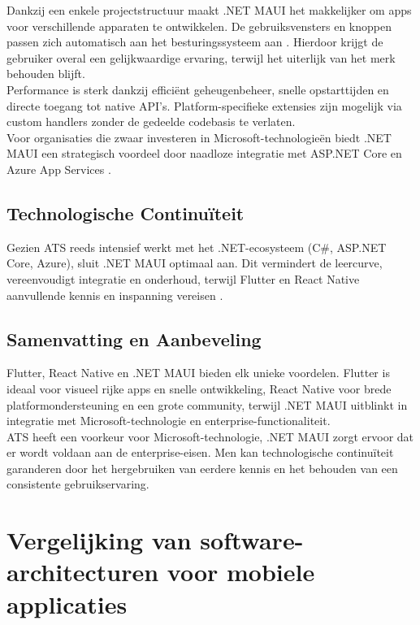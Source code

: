 Dankzij een enkele projectstructuur maakt .NET MAUI het makkelijker om apps voor verschillende apparaten te ontwikkelen. De gebruiksvensters en knoppen passen zich automatisch aan het besturingssysteem aan \autocite{Omsha2024}. Hierdoor krijgt de gebruiker overal een gelijkwaardige ervaring, terwijl het uiterlijk van het merk behouden blijft.\\

Performance is sterk dankzij efficiënt geheugenbeheer, snelle opstarttijden en directe toegang tot native API’s. Platform-specifieke extensies zijn mogelijk via custom handlers zonder de gedeelde codebasis te verlaten.\\

Voor organisaties die zwaar investeren in Microsoft-technologieën biedt .NET MAUI een strategisch voordeel door naadloze integratie met ASP.NET Core en Azure App Services \autocite{Klesman2023}.

\subsection{Technologische Continuïteit}
Gezien ATS reeds intensief werkt met het .NET-ecosysteem (C#, ASP.NET Core, Azure), sluit .NET MAUI optimaal aan. Dit vermindert de leercurve, vereenvoudigt integratie en onderhoud, terwijl Flutter en React Native aanvullende kennis en inspanning vereisen \autocite{Longe2025}.

\subsection{Samenvatting en Aanbeveling}
Flutter, React Native en .NET MAUI bieden elk unieke voordelen. Flutter is ideaal voor visueel rijke apps en snelle ontwikkeling, React Native voor brede platformondersteuning en een grote community, terwijl .NET MAUI uitblinkt in integratie met Microsoft-technologie en enterprise-functionaliteit.\\


ATS heeft een voorkeur voor Microsoft-technologie, .NET MAUI zorgt ervoor dat er wordt voldaan aan de enterprise-eisen. Men kan technologische continuïteit garanderen door het hergebruiken van eerdere kennis en het behouden van een consistente gebruikservaring. 

\section{Vergelijking van software-architecturen voor mobiele applicaties}

